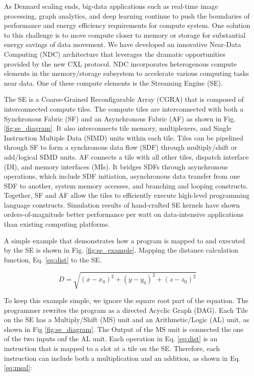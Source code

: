 As Dennard scaling ends, big-data applications such as real-time image processing, graph analytics, and deep learning continue to push the boundaries of performance and energy efficiency requirements for compute system. 
One solution to this challenge is to move compute closer to memory or storage for substantial energy savings of data movement. 
We have developed an innovative Near-Data Computing (NDC) architecture that leverages the dramatic opportunities provided by the new CXL protocol. 
NDC incorporates heterogenous compute elements in the memory/storage subsystem to accelerate various computing tasks near data. 
One of these compute elements is the Streaming Engine (SE).

The SE is a Coarse-Grained Reconfigurable Array (CGRA) that is composed of interconnected compute tiles.  
The compute tiles are interconnected with both a Synchronous Fabric (SF) and an Asynchronous Fabric (AF) as shown in Fig. \ref{fig:se_diagram}.
It also interconnects tile memory, multiplexers, and Single Instruction Multiple Data (SIMD) units within each tile. 
Tiles can be pipelined through SF to form a synchronous data flow (SDF) through multiply/shift or add/logical SIMD units. 
AF connects a tile with all other tiles, dispatch interface (DI), and memory interfaces (MIs). 
It bridges SDFs through asynchronous operations, which include SDF initiation, asynchronous data transfer from one SDF to another, system memory accesses, and branching and looping constructs. 
Together, SF and AF allow the tiles to efficiently execute high-level programming language constructs. 
Simulation results of hand-crafted SE kernels have shown orders-of-magnitude better performance per watt on data-intensive applications than existing computing platforms.

A simple example that demonstrates how a program is mapped to and executed by the SE is shown in Fig. \ref{fig:se_example}.
Mapping the distance calculation function, Eq. \ref{eq:dist} to the SE.

\begin{equation}
    \label{eq:dist}
    D = \sqrt{(x - x_0)^2 +(y - y_0)^2 + (z - z_0)^2}
\end{equation}

To keep this example simple, we ignore the square root part of the equation.
The programmer rewrites the program as a directed Acyclic Graph (DAG).
Each Tile on the SE has a Multiply/Shift (MS) unit and an Arithmetic/Logic (AL) unit, as shown in Fig \ref{fig:se_diagram}.
The Output of the MS unit is connected the one of the two inputs onf the AL unit.
Each operation in Eq. \ref{eq:dist} is an instruction that is mapped to a slot at a tile on the SE.
Therefore, each instruction can include both a multiplication and an addition, as shown in Eq. \ref{eq:msal}:

